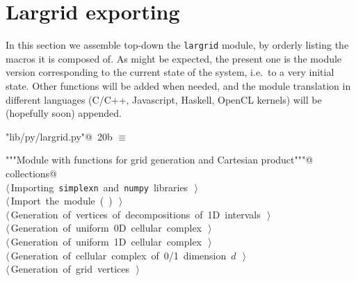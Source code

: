 \documentclass[11pt,oneside]{article}	%
\begin{document}
\section{Largrid exporting}
\label{sec:largrid}
In this section we assemble top-down the \texttt{largrid} module, by orderly listing the macros it is composed of. As might be expected, the present one is the module version corresponding to the current state of the system, i.e.~to a very initial state. Other functions will be added when needed, and the module translation in different languages (C/C++, Javascript, Haskell, OpenCL kernels) will be (hopefully soon) appended.
\begin{flushleft} \small \label{scrap32}
\protect{}\verb@"lib/py/largrid.py"@\nobreak\ {\footnotesize 20b }$\equiv$
\vspace{-1ex}
\begin{list}{}{} \item
\mbox{}\verb@"""Module with functions for grid generation and Cartesian product"""@\\
\mbox{}\verb@import collections@\\
\mbox{}\verb@@\hbox{$\langle\,$Importing \texttt{simplexn} and \texttt{numpy} libraries\nobreak\ {\footnotesize {}}$\,\rangle$}\verb@@\\
\mbox{}\verb@@\hbox{$\langle\,$Import the module\nobreak\ ({\footnotesize {}\label{scrap33}
 }\mbox{}\verb@larcc@ ) {\footnotesize {}}$\,\rangle$}\verb@@\\
\mbox{}\verb@@\hbox{$\langle\,$Generation of vertices of decompositions of 1D intervals\nobreak\ {\footnotesize {}}$\,\rangle$}\verb@@\\
\mbox{}\verb@@\hbox{$\langle\,$Generation of uniform 0D cellular complex\nobreak\ {\footnotesize {}}$\,\rangle$}\verb@@\\
\mbox{}\verb@@\hbox{$\langle\,$Generation of uniform 1D cellular complex\nobreak\ {\footnotesize {}}$\,\rangle$}\verb@@\\
\mbox{}\verb@@\hbox{$\langle\,$Generation of cellular complex of 0/1 dimension $d$\nobreak\ {\footnotesize {}}$\,\rangle$}\verb@@\\
\mbox{}\verb@@\hbox{$\langle\,$Generation of grid vertices\nobreak\ {\footnotesize {}}$\,\rangle$}\verb@@\\

\end{list}
\end{flushleft}
\end{document}
